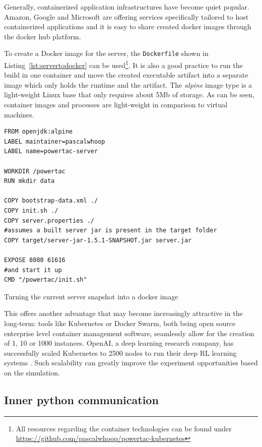 Generally, containerized application infrastructures have become quiet popular. Amazon, Google and Microsoft are offering
services specifically tailored to host containerized applications and it is easy to share created docker images
through the docker hub platform.

To create a Docker image for the server, the \texttt{Dockerfile} shown in Listing~\ref{lst:servertodocker} can be
used\footnote{All resources regarding the container technologies can be found under
\url{https://github.com/pascalwhoop/powertac-kubernetes}}.
It is also a good practice to run the build in one container and move the created executable artifact into a separate
image which only holds the runtime and the artifact. The \emph{alpine} image type is a light-weight Linux base that
only requires about 5Mb of storage. As can be seen, container images and processes are light-weight in
comparison to virtual machines.

\begin{listing}[h]

    \begin{verbatim}
FROM openjdk:alpine
LABEL maintainer=pascalwhoop
LABEL name=powertac-server

WORKDIR /powertac
RUN mkdir data

COPY bootstrap-data.xml ./
COPY init.sh ./
COPY server.properties ./
#assumes a built server jar is present in the target folder
COPY target/server-jar-1.5.1-SNAPSHOT.jar server.jar

EXPOSE 8080 61616
#and start it up
CMD "/powertac/init.sh"
    \end{verbatim}
    \caption{Turning the current server snapshot into a docker image}
    \label{lst:servertodocker}
\end{listing}

This offers another advantage that may become increasingly attractive in the long-term: tools like Kubernetes or Docker
Swarm, both being open source enterprise level container management software, seamlessly allow for the creation of 1, 10
or 1000 instances. OpenAI, a deep learning research company, has successfully scaled Kubernetes to 2500 nodes to run
their deep \ac{RL} learning systems \citep{openai2500}. Such scalability can greatly improve the experiment
opportunities based on the simulation.

\subsection{Inner python communication}%
\label{sub:inner_python_communication}

